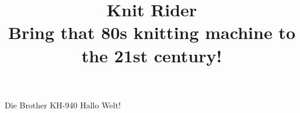 \documentclass{beamer}
\title{\Huge{Knit Rider}\\
    \large{Bring that 80s knitting machine to the 21st century!}
}
\begin{document}
\maketitle

\begin{frame}{Die Brother KH-940}
    Hallo Welt!
\end{frame}
\end{document}
